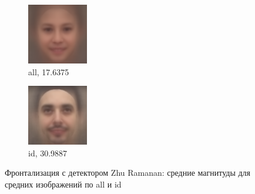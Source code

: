 \begin{figure}[h]
\centering
	\begin{subfigure}[t]{0.3\textwidth}
		\includegraphics[width=\textwidth]{results/all_front_mean.png}
		\caption{all, 17.6375}
	\end{subfigure}
	\begin{subfigure}[t]{0.3\textwidth}
		\includegraphics[width=\textwidth]{results/id2_front_mean.png}
		\caption{id, 30.9887}
	\end{subfigure}
	\caption{Фронтализация с детектором Zhu Ramanan: средние магнитуды для средних изображений по all и id}
	\label{fig:exp_zr}
\end{figure}

